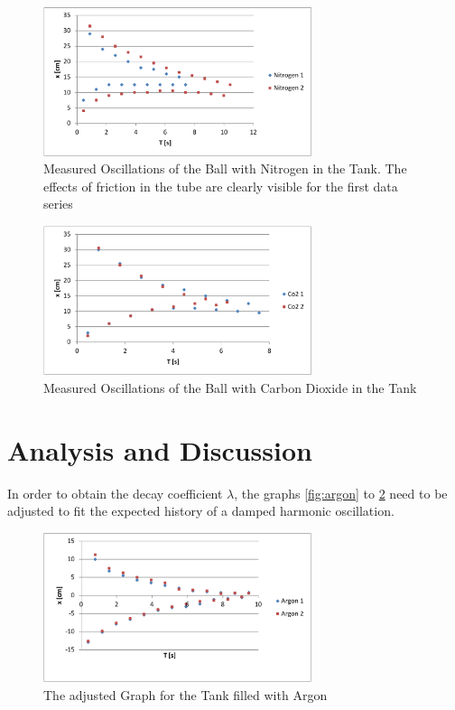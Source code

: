 \documentclass{scrreprt}
\begin{document}
\begin{figure}[H]
	\centering
  \includegraphics[width=0.7\textwidth]{diag/nitrogen.pdf}
	\caption{Measured Oscillations of the Ball with Nitrogen in the Tank. The effects of friction in the tube are clearly visible for the first data series}
	\label{fig:nitrogen}
\end{figure}

\begin{figure}[H]
	\centering
  \includegraphics[width=0.7\textwidth]{diag/co2.pdf}
	\caption{Measured Oscillations of the Ball with Carbon Dioxide in the Tank}
	\label{fig:co2}
\end{figure}

\newpage
\section{Analysis and Discussion}
\label{sec:discussion}
In order to obtain the decay coefficient $\lambda$, the graphs \ref{fig:argon} to \ref{fig:co2} need to be adjusted to fit the expected history of a damped harmonic oscillation. 

\begin{figure}[H]
	\centering
  \includegraphics[width=0.7\textwidth]{diag/argon_adjusted.pdf}
	\caption{The adjusted Graph for the Tank filled with Argon}
	\label{fig:argon_adjusted}
\end{figure}
\end{document}
